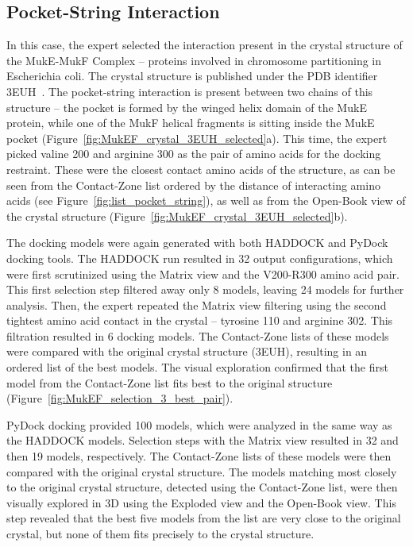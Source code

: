 \documentclass{bmcart}
\def\OpBook {Open-Book view\xspace}
\def\ExpView {Exploded view\xspace}
\def\MatView {Matrix view\xspace}
\def\CoZoList{Contact-Zone list\xspace}
\def\CoZoLists{Contact-Zone lists\xspace}
\begin{document}
\subsection{Pocket-String Interaction}
In this case, the expert selected the interaction present in the crystal structure of the MukE-MukF Complex -- proteins involved in chromosome partitioning in Escherichia coli. 
The crystal structure is published under the PDB identifier 3EUH~\cite{Woo}. 
The pocket-string interaction is present between two chains of this structure -- the pocket is formed by the winged helix domain of the MukE protein, while one of the MukF helical fragments is sitting inside the MukE pocket (Figure~\ref{fig:MukEF_crystal_3EUH_selected}a). 
This time, the expert picked valine 200 and arginine 300 as the pair of amino acids for the docking restraint. 
These were the closest contact amino acids of the structure, as can be seen from the \CoZoList ordered by the distance of interacting amino acids (see Figure~\ref{fig:list_pocket_string}), as well as from the \OpBook of the crystal structure (Figure~\ref{fig:MukEF_crystal_3EUH_selected}b). 

The docking models were again generated with both HADDOCK and PyDock docking tools.
The HADDOCK run resulted in 32 output configurations, which were first scrutinized using the \MatView and the V200-R300 amino acid pair. 
This first selection step filtered away only 8 models, leaving 24 models for further analysis. 
Then, the expert repeated the \MatView filtering using the second tightest amino acid contact in the crystal -- tyrosine 110 and arginine 302. 
This filtration resulted in 6 docking models. 
The \CoZoLists of these models were compared with the original crystal structure (3EUH), resulting in an ordered list of the best models.
The visual exploration confirmed that the first model from the \CoZoList fits best to the original structure (Figure~\ref{fig:MukEF_selection_3_best_pair}). 

PyDock docking provided 100 models, which were analyzed in the same way as the HADDOCK models. 
Selection steps with the \MatView resulted in 32 and then 19 models, respectively. 
The \CoZoLists of these models were then compared with the original crystal structure.
The models matching most closely to the original crystal structure, detected using the \CoZoList, were then visually explored in 3D using the \ExpView and the \OpBook.
This step revealed that the best five models from the list are very close to the original crystal, but none of them fits precisely to the crystal structure.
\end{document}
